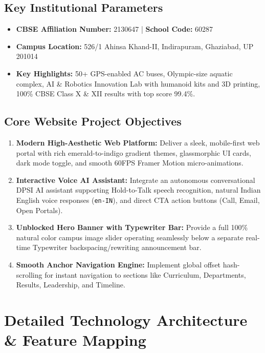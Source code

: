 \documentclass[11pt,a4paper]{article}
\begin{document}
\subsection{Key Institutional Parameters}
\begin{itemize}[leftmargin=*]
    \item \textbf{CBSE Affiliation Number:} 2130647 | \textbf{School Code:} 60287
    \item \textbf{Campus Location:} 526/1 Ahinsa Khand-II, Indirapuram, Ghaziabad, UP 201014
    \item \textbf{Key Highlights:} 50+ GPS-enabled AC buses, Olympic-size aquatic complex, AI \& Robotics Innovation Lab with humanoid kits and 3D printing, 100\% CBSE Class X \& XII results with top score 99.4\%.
\end{itemize}

\subsection{Core Website Project Objectives}
\begin{enumerate}
    \item \textbf{Modern High-Aesthetic Web Platform:} Deliver a sleek, mobile-first web portal with rich emerald-to-indigo gradient themes, glassmorphic UI cards, dark mode toggle, and smooth 60FPS Framer Motion micro-animations.
    \item \textbf{Interactive Voice AI Assistant:} Integrate an autonomous conversational DPSI AI assistant supporting Hold-to-Talk speech recognition, natural Indian English voice responses (\texttt{en-IN}), and direct CTA action buttons (Call, Email, Open Portals).
    \item \textbf{Unblocked Hero Banner with Typewriter Bar:} Provide a full 100\% natural color campus image slider operating seamlessly below a separate real-time Typewriter backspacing/rewriting announcement bar.
    \item \textbf{Smooth Anchor Navigation Engine:} Implement global offset hash-scrolling for instant navigation to sections like Curriculum, Departments, Results, Leadership, and Timeline.
\end{enumerate}

\section{Detailed Technology Architecture \& Feature Mapping}
\end{document}
